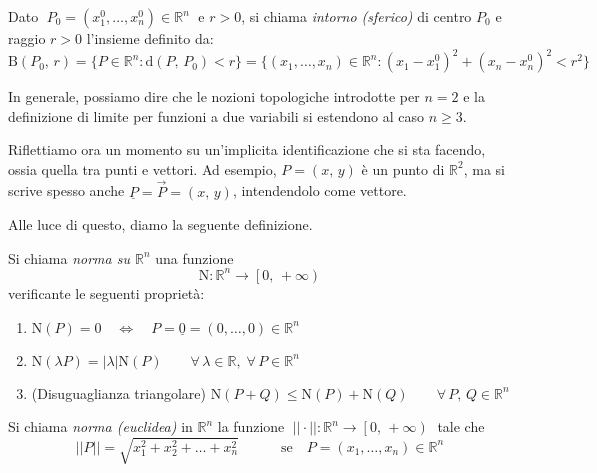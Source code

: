 \begin{definition}
Dato $\; P_0 = (x_1^0,\ldots,x_n^0) \in \mathbb{R}^n \;$ e $r>0$, si chiama \emph{intorno (sferico)} di centro $P_0$ e raggio $r>0$ l'insieme definito da:
$$\mathrm{B}(P_0,\, r)=
\lbrace P \in \mathbb{R}^n : \mathrm{d}(P,\, P_0) < r \rbrace = \lbrace (x_1,\ldots,x_n) \in \mathbb{R}^n : (x_1-x_1^0)^2+(x_n-x_n^0)^2 < r^2 \rbrace$$
\end{definition}

In generale, possiamo dire che le nozioni topologiche introdotte per $n=2$ e la definizione di limite per funzioni a due variabili si estendono al caso $n \geq 3$.

Riflettiamo ora un momento su un'implicita identificazione che si sta facendo, ossia quella tra punti e vettori. Ad esempio, $P = (x,\, y)$ è un punto di $\mathbb{R}^2$, ma si scrive spesso anche $\underline{P} = \overset{\rightarrow}{P} = (x,\, y)$, intendendolo come vettore.

Alle luce di questo, diamo la seguente definizione. 

\begin{definition}
Si chiama \emph{norma su $\mathbb{R}^n$} una funzione $$\mathrm{N}:\mathbb{R}^n \longrightarrow \left[0,\, +\infty\right)$$
verificante le seguenti proprietà:
\begin{enumerate}[labelindent=\parindent,leftmargin=*,label=\textnormal{(N\arabic*)},start=1]
\item $\mathrm{N}(P)=0 \quad \Longleftrightarrow \quad P=\underline{0}=(0,\ldots,0) \in \mathbb{R}^n$
\item $\mathrm{N}(\lambda P) = |\lambda|\mathrm{N}(P) \qquad \forall \, \lambda \in \mathbb{R}, \; \forall \, P \in \mathbb{R}^n$
\item (Disuguaglianza triangolare) $\mathrm{N}(P+Q) \leq \mathrm{N}(P) + \mathrm{N}(Q) \qquad \forall \, P,\, Q \in \mathbb{R}^n$
\end{enumerate}
\begin{center}
\def\svgwidth{7cm}

\end{center}
\end{definition}

\begin{definition}
Si chiama \emph{norma (euclidea)} in $\mathbb{R}^n$ la funzione $\; ||\cdot||:\mathbb{R}^n \longrightarrow \left[0,\, +\infty \right) \;$ tale che
$$||P|| = \sqrt{x_1^2+x_2^2+\ldots+x_n^2} \qquad \quad \text{se} \quad P=(x_1,\ldots,x_n) \in \mathbb{R}^n$$
\end{definition}

